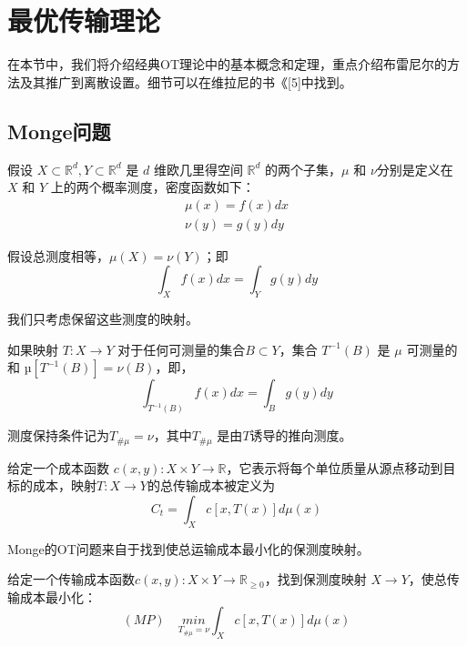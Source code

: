 
\section{最优传输理论}

在本节中，我们将介绍经典OT理论中的基本概念和定理，重点介绍布雷尼尔的方法及其推广到离散设置。细节可以在维拉尼的书《[5]中找到。

\subsection{Monge问题}

假设 $X \subset \mathbb{R}^d, Y \subset \mathbb{R}^d $ 是 $ d $ 维欧几里得空间 $ \mathbb{R}^d $ 的两个子集，$\mu$ 和 $\nu$分别是定义在 $X$ 和 $Y$ 上的两个概率测度，密度函数如下：
\begin{equation*}
	\begin{array}{c} 
		\mu(x) =f(x)dx \\ 
		\nu (y) =g(y)dy 
	\end{array}
\end{equation*}

假设总测度相等，$\mu(X)=\nu(Y)$；即
\begin{equation}
	\int_X f(x)dx =\int_Y g(y)dy
	\label{function:1}
\end{equation}

我们只考虑保留这些测度的映射。

\begin{definition}[保留测度映射]	\label{def:3.1}
	如果映射 $T: X \to Y $ 对于任何可测量的集合$B \subset Y $，集合 $T^{-1}(B)$ 是 $\mu$ 可测量的和 $µ[T^{-1}(B)]=\nu(B)$，即，
	\begin{equation}
		\int_{T^{-1}(B)} f(x)dx =\int_B g(y)dy
		\label{function:2}
	\end{equation}

	测度保持条件记为$T_{\# \mu}=\nu$，其中$T_{\#\mu}$ 是由$T$诱导的推向测度。
\end{definition}

给定一个成本函数 $c(x,y): X \times Y \to \mathbb{R} $，它表示将每个单位质量从源点移动到目标的成本，映射$T: X \to Y$的总传输成本被定义为
\begin{equation}
	C_t=\int_X c[x,T(x)]d\mu (x) 
	\label{function:3}
\end{equation}

Monge的OT问题来自于找到使总运输成本最小化的保测度映射。

\begin{problem}[蒙日【43】;MP]	\label{problem:3.1}
	给定一个传输成本函数$c(x,y): X \times Y\to\mathbb{R}_{\ge 0}$，找到保测度映射 $X \to Y$，使总传输成本最小化：
	\begin{equation}
		(MP) \quad \underset{T_{\# \mu}=\nu}{min} \int_X c[x,T(x)]d\mu(x)  
		\label{function:4}
	\end{equation}
\end{problem}

